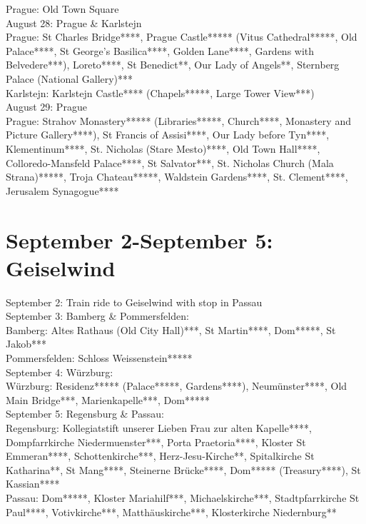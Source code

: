 {Prague: Old Town Square\\

August 28: Prague \& Karlstejn\\

Prague: St Charles Bridge****, Prague Castle***** (Vitus Cathedral*****, Old Palace****, St George's Basilica****, Golden Lane****, Gardens with Belvedere***), Loreto****, St Benedict**, Our Lady of Angels**, Sternberg Palace (National Gallery)***\\
Karlstejn: Karlstejn Castle**** (Chapels*****, Large Tower View***)\\

August 29: Prague\\

Prague: Strahov Monastery***** (Libraries*****, Church****, Monastery and Picture Gallery****), St Francis of Assisi****, Our Lady before Tyn****, Klementinum****, St. Nicholas (Stare Mesto)****, Old Town Hall****, Colloredo-Mansfeld Palace****, St Salvator***,
St. Nicholas Church (Mala Strana)*****, Troja Chateau*****, Waldstein Gardens****, St. Clement****, Jerusalem Synagogue****\\

\section{September 2-September 5: Geiselwind}
\label{2021Geiselwind}

September 2: Train ride to Geiselwind with stop in Passau\\

September 3: Bamberg \& Pommersfelden:\\

Bamberg: Altes Rathaus (Old City Hall)***, St Martin****, Dom*****, St Jakob***\\
Pommersfelden: Schloss Weissenstein*****\\

September 4: W\"urzburg:\\

W\"urzburg: Residenz***** (Palace*****, Gardens****), Neum\"unster****, Old Main Bridge***, Marienkapelle***, Dom*****\\

September 5: Regensburg \& Passau:\\

Regensburg: Kollegiatstift unserer Lieben Frau zur alten Kapelle****, Dompfarrkirche Niedermuenster***, Porta Praetoria****, Kloster St Emmeran****, Schottenkirche***, Herz-Jesu-Kirche**, Spitalkirche St Katharina**, St Mang****, Steinerne Br\"ucke****, Dom***** (Treasury****), St Kassian****\\
Passau: Dom*****, Kloster Mariahilf***, Michaelskirche***, Stadtpfarrkirche St Paul****, Votivkirche***, Matth\"auskirche***, Klosterkirche Niedernburg**

}
